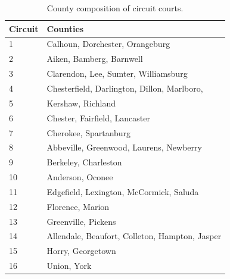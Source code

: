 \documentclass[11pt, oneside]{article}   	%
\newcommand{\rowgroup}[1]{\hspace{-1em}#1}
\theoremstyle{ModifiedStyle}
\begin{document}
\begin{table}[H]
	\centering
	\caption{County composition of circuit courts.}
	\vspace{0mm}
	\setlength\tabcolsep{8pt} %
	{\footnotesize
		\begin{tabular}{C{10mm}L{70mm}}
			\toprule
			Circuit & Counties  \\
			\midrule
			1 & Calhoun, Dorchester, Orangeburg \\
			2 & Aiken, Bamberg, Barnwell \\
			3 & Clarendon, Lee, Sumter, Williamsburg \\
			4 & Chesterfield, Darlington, Dillon, Marlboro,  \\
			5 & Kershaw, Richland \\
			6 & Chester, Fairfield, Lancaster \\
			7 & Cherokee, Spartanburg \\
			8 & Abbeville, Greenwood, Laurens, Newberry  \\
			9 & Berkeley, Charleston \\
			10 & Anderson, Oconee \\
			11 & Edgefield, Lexington, McCormick, Saluda  \\
			12 & Florence, Marion \\
			13 & Greenville, Pickens \\
			14 & Allendale, Beaufort, Colleton, Hampton, Jasper \\
			15 & Horry, Georgetown \\
			16 & Union, York \\
			\bottomrule
		\end{tabular}
	}
	\label{Table_Circuit_Court_Counties}
\end{table}
\end{document}
